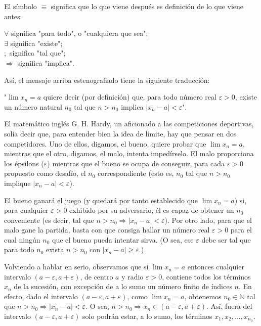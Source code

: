 \documentclass[12pt,oneside]{book}
\begin{document}
El símbolo \(\equiv\) significa que lo que viene después es definición de lo que viene antes:

\(\forall\) significa "para todo", o "cualquiera que sea";\\
\(\exists\) significa "existe";\\
\(;\) significa "tal que";\\
\(\Rightarrow\) significa "implica".

Así, el mensaje arriba estenografiado tiene la siguiente traducción:

"\(\lim x_n = a\) quiere decir (por definición) que, para todo número real \(\varepsilon > 0\), existe un número natural \(n_0\) tal que \(n > n_0\) implica \(|x_n - a| < \varepsilon\)".

El matemático inglés G. H. Hardy, un aficionado a las competiciones deportivas, solía decir que, para entender bien la idea de límite, hay que pensar en dos competidores. Uno de ellos, digamos, el bueno, quiere probar que \(\lim x_n = a\), mientras que el otro, digamos, el malo, intenta impedírselo. El malo proporciona los épsilons (\(\varepsilon\)) mientras que el bueno se ocupa de conseguir, para cada \(\varepsilon > 0\) propuesto como desafío, el \(n_0\) correspondiente (esto es, \(n_0\) tal que \(n > n_0\) implique \(|x_n - a| < \varepsilon\)).

El bueno ganará el juego (y quedará por tanto establecido que \(\lim x_n = a\)) si, para cualquier \(\varepsilon > 0\) exhibido por su adversario, él es capaz de obtener un \(n_0\) conveniente (es decir, tal que \(n > n_0 \Rightarrow |x_n - a| < \varepsilon\)). Por otro lado, para que el malo gane la partida, basta con que consiga hallar un número real \(\varepsilon > 0\) para el cual ningún \(n_0\) que el bueno pueda intentar sirva. (O sea, ese \(\varepsilon\) debe ser tal que para todo \(n_0\) exista \(n > n_0\) con \(|x_n - a| \geq \varepsilon\).)

Volviendo a hablar en serio, observamos que si \(\lim x_n = a\) entonces cualquier intervalo \((a - \varepsilon, a + \varepsilon)\), de centro \(a\) y radio \(\varepsilon > 0\), contiene todos los términos \(x_n\) de la sucesión, con excepción de a lo sumo un número finito de índices \(n\). En efecto, dado el intervalo \((a - \varepsilon, a + \varepsilon)\), como \(\lim x_n = a\), obtenemos \(n_0 \in \mathbb{N}\) tal que \(n > n_0 \Rightarrow |x_n - a| < \varepsilon\). O sea, \(n > n_0 \Rightarrow x_n \in (a - \varepsilon, a + \varepsilon)\). Así, fuera del intervalo \((a - \varepsilon, a + \varepsilon)\) solo podrán estar, a lo sumo, los términos \(x_1, x_2, \ldots, x_{n_0}\).
\end{document}
